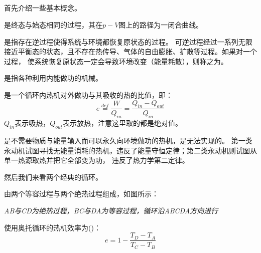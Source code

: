         \subsection[热机]{}
            首先介绍一些基本概念。
            \begin{Itemize}
                \item {}是终态与始态相同的过程，其在$p-V$图上的路径为一闭合曲线。
                \item {}是指存在逆过程使得系统与环境都恢复原状态的过程。
                可逆过程经过一系列无限接近平衡态的状态，且不存在热传导、气体的自由膨胀、扩散等过程。如果对一个过程，
                使系统恢复原状态一定会导致环境改变（能量耗散），则称之为。
                \item {}是指各种利用内能做功的机械。
            \end{Itemize}
            \begin{Itemize}
                \item {}是一个循环内热机对外做功与其吸收的热的比值，即：
                \begin{equation}
                    e \overset{def}{=} \frac{W}{Q_{in}} = \frac{Q_{in}-Q_{out}}{Q_{in}}
                    \nonumber
                \end{equation}
                $Q_{in}$表示吸热，$Q_{out}$表示放热，注意这里取的都是绝对值。
                \item {}是不需要物质与能量输入而可以永久向环境做功的热机，是无法实现的。
                第一类永动机试图寻找无能量消耗的热机，违反了能量守恒定律；第二类永动机则试图从单一热源取热并把它全部变为功，
                违反了热力学第二定律。
            \end{Itemize}
            然后我们来看两个经典的循环。

            由两个等容过程与两个绝热过程组成，如图所示：
            \vspace{1ex}
            \begin{center}
            	\em AB与CD为绝热过程，BC与DA为等容过程，循环沿ABCDA方向进行
            \end{center}
            使用奥托循环的热机效率为()：
            \begin{equation}
                e = 1 - \frac{T_{D} - T_{A}}{T_{C} - T_{B}}
                \nonumber
            \end{equation}
            
